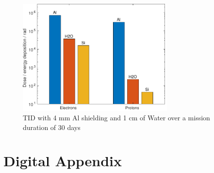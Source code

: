 

\begin{figure}[htp]
	\centering
	\includegraphics[width=0.7\textwidth]{Media/J_Improvements_Ice}
	\caption{TID with 4 mm Al shielding and 1 cm of Water over a mission duration of 30 days}
	\label{fig:Radiation_Improvements_Ice}
\end{figure}

\clearpage

\setcounter{figure}{0}
\setcounter{table}{0}

\section{Digital Appendix}		\label{app:DigitalAppendix}


